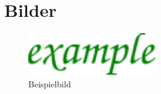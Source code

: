 \documentclass[a4paper, 10pt, fleqn]{article}
\begin{document}
\section{Bilder}
\begin{figure}[h!]
    \centering
    \includegraphics[width=0.5\textwidth] {../fig/example.pdf}
    \caption{Beispielbild}
    \label{fig:example}
\end{figure}
\end{document}
